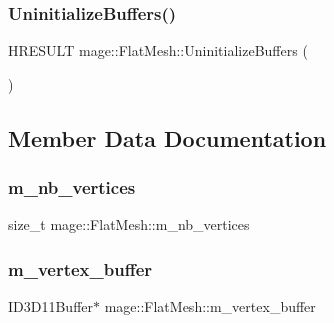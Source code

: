 \hypertarget{classmage_1_1_flat_mesh_ad355db238528f60d6600bc55a923f0bb}{}\label{classmage_1_1_flat_mesh_ad355db238528f60d6600bc55a923f0bb} 
\subsubsection{\texorpdfstring{Uninitialize\+Buffers()}{UninitializeBuffers()}}
{\footnotesize\ttfamily H\+R\+E\+S\+U\+LT mage\+::\+Flat\+Mesh\+::\+Uninitialize\+Buffers (\begin{DoxyParamCaption}{ }\end{DoxyParamCaption})\hspace{0.3cm}{\ttfamily [protected]}}



\subsection{Member Data Documentation}
\hypertarget{classmage_1_1_flat_mesh_aabb71e0a08a465ca439e444c2325d29f}{}\label{classmage_1_1_flat_mesh_aabb71e0a08a465ca439e444c2325d29f} 
\subsubsection{\texorpdfstring{m\+\_\+nb\+\_\+vertices}{m\_nb\_vertices}}
{\footnotesize\ttfamily size\+\_\+t mage\+::\+Flat\+Mesh\+::m\+\_\+nb\+\_\+vertices\hspace{0.3cm}{\ttfamily [protected]}}

\hypertarget{classmage_1_1_flat_mesh_a13c42fe158747be15789463d8d06072b}{}\label{classmage_1_1_flat_mesh_a13c42fe158747be15789463d8d06072b} 
\subsubsection{\texorpdfstring{m\+\_\+vertex\+\_\+buffer}{m\_vertex\_buffer}}
{\footnotesize\ttfamily I\+D3\+D11\+Buffer$\ast$ mage\+::\+Flat\+Mesh\+::m\+\_\+vertex\+\_\+buffer\hspace{0.3cm}{\ttfamily [protected]}}


